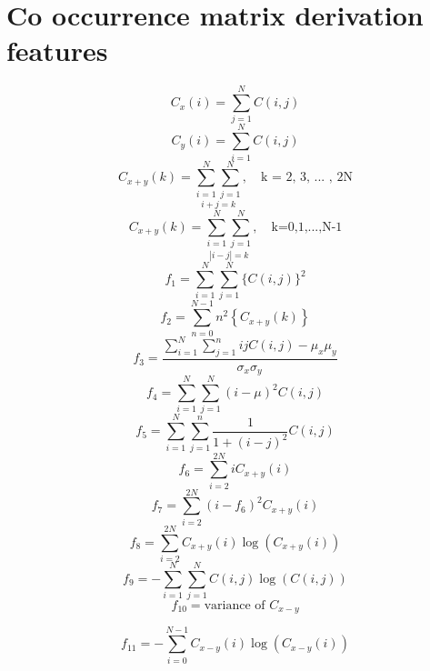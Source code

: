 \chapter{Co occurrence matrix derivation features}
\label{derivationfeatures}
\[
C_x(i) = \sum_{j=1}^{N}C(i,j)
\]
\[
C_y(i) = \sum_{i=1}^{N}C(i,j)
\]
\[
C_{x+y}(k) = \underset{i+j=k}{\sum_{i=1}^{N}\sum_{j=1}^{N}}, \quad \text{k = 2, 3, ... , 2N}
\]
\[
C_{x+y}(k) = \underset{|i-j|=k}{\sum_{i=1}^{N}\sum_{j=1}^{N}}, \quad \text{k=0,1,...,N-1}
\]
\begin{equation}\label{AngularSecondMoment}
  f_1 = \sum_{i=1}^{N}\sum_{j=1}^{N}\{C(i,j)\}^2
\end{equation}
\begin{equation}\label{Contrast}
  f_2 = \sum_{n=0}^{N-1} n^2 \left\{C_{x+y}(k)\right\}
\end{equation}
\begin{equation}\label{Correlation}
  f_3 = \frac{\sum_{i=1}^{N}\sum_{j=1}^{n} i j C(i,j) - \mu_x \mu_y}{\sigma_x\sigma_y}
\end{equation}
\begin{equation}\label{Variance}
  f_4 = \sum_{i=1}^{N}\sum_{j=1}^{N}(i-\mu)^2 C(i,j)
\end{equation}
\begin{equation}\label{InverseDifferenceMoment}
  f_5 = \sum_{i=1}^{N}\sum_{j=1}^{n} \frac{1}{1+(i-j)^2} C(i,j)
\end{equation}
\begin{equation}\label{SumAverage}
  f_6 = \sum_{i=2}^{2N} i C_{x+y}(i)
\end{equation}
\begin{equation}\label{SumVariance}
  f_7 = \sum_{i=2}^{2N} (i - f_6)^2 C_{x+y}(i)
\end{equation}
\begin{equation}\label{SumEntropy}
  f_8 = \sum_{i=2}^{2N}C_{x+y}(i) \log(C_{x+y}(i))
\end{equation}
\begin{equation}\label{Entropy}
  f_9 = -\sum_{i=1}^{N}\sum_{j=1}^{N} C(i,j) \log(C(i,j))
\end{equation}
\begin{equation}\label{DifferenceVariance}
  f_{10} = \text{variance of }C_{x-y}
\end{equation}

\begin{equation}\label{DifferenceEntropy}
  f_{11} = -\sum_{i=0}^{N-1} C_{x-y}(i) \log(C_{x-y}(i))
\end{equation} 